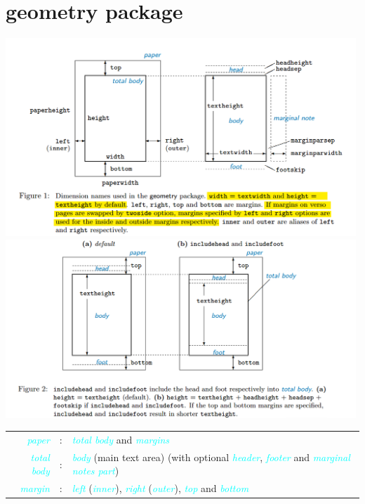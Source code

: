 \documentclass[a4paper,oneside]{book}
\newcommand{\coloritsf}[1]{\textcolor{cyan}{\sffamily\itshape #1}}
\newcommand{\package}[1]{\textsf{#1}}
\begin{document}
\section{\package{geometry} package}
\begin{center}
  \includegraphics[width=0.99\textwidth]{geometry_figure_1}
  \includegraphics[width=0.99\textwidth]{geometry_figure_2}
\end{center}

\begin{table}[htpb]
\noindent\begin{tabular}[h]{|rcp{9cm}|}
  \hline
\coloritsf{paper}&:&\coloritsf{total body} and \coloritsf{margins}\\
\coloritsf{total body}&:&\coloritsf{body} (main text area) (with optional \coloritsf{header}, \coloritsf{footer} and \coloritsf{marginal notes part})\\
\coloritsf{margin}&:&\coloritsf{left} (\coloritsf{inner}), \coloritsf{right} (\coloritsf{outer}), \coloritsf{top} and \coloritsf{bottom}\\
\hline
\end{tabular}
\end{table}
\end{document}
